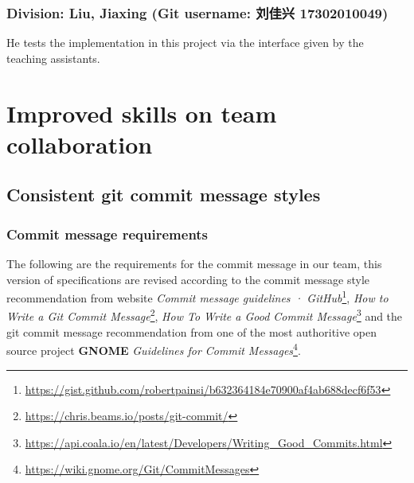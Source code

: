 \documentclass[a4paper]{report}
\begin{document}
\subsection{Division: Liu, Jiaxing (Git username: 刘佳兴 17302010049) }
He tests the implementation in this project via the interface given by the teaching assistants.

\chapter{Improved skills on team collaboration}
\section{Consistent git commit message styles}
\subsection{Commit message requirements}
The following are the requirements for the commit message in our team, this version of specifications are revised according to the commit message style recommendation from website \emph{Commit message guidelines · GitHub}\footnote{\url{https://gist.github.com/robertpainsi/b632364184e70900af4ab688decf6f53}}, \emph{How to Write a Git Commit Message}\footnote{\url{https://chris.beams.io/posts/git-commit/}}, \emph{How To Write a Good Commit Message}\footnote{\url{https://api.coala.io/en/latest/Developers/Writing_Good_Commits.html}} and the git commit message recommendation from one of the most authoritive open source project \textbf{GNOME} \emph{Guidelines for Commit Messages}\footnote{\url{https://wiki.gnome.org/Git/CommitMessages}}.
\end{document}
